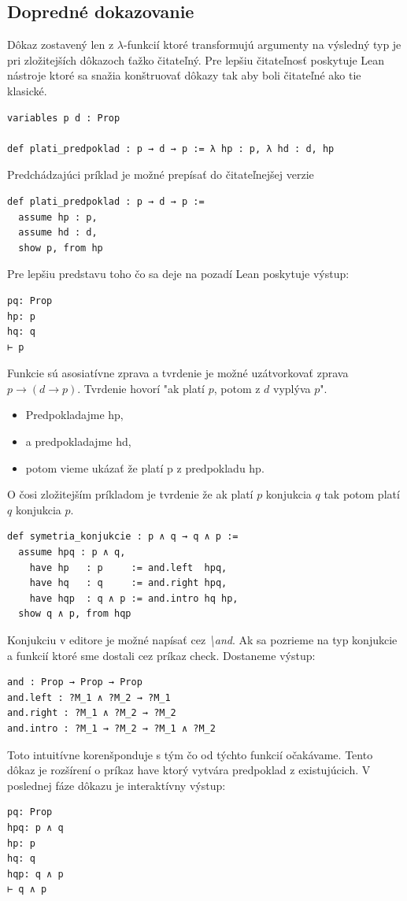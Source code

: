 \documentclass[a4paper,10pt,oneside]{report}%
\begin{document}
\subsection{Dopredné dokazovanie}
    Dôkaz zostavený len z $\lambda$-funkcií ktoré transformujú argumenty
na výsledný typ je pri zložitejších dôkazoch ťažko čitateľný.
    Pre lepšiu čitateľnosť poskytuje Lean nástroje ktoré sa snažia konštruovať dôkazy tak
aby boli čitateľné ako tie klasické.
\begin{lstlisting}
variables p d : Prop

def plati_predpoklad : p → d → p := λ hp : p, λ hd : d, hp
\end{lstlisting}
    Predchádzajúci príklad je možné prepísať do čitateľnejšej verzie
\begin{lstlisting}
def plati_predpoklad : p → d → p :=
  assume hp : p,
  assume hd : d,
  show p, from hp
\end{lstlisting}
Pre lepšiu predstavu toho čo sa deje na pozadí Lean poskytuje výstup:
\begin{lstlisting}
pq: Prop
hp: p
hq: q
⊢ p
\end{lstlisting}
    Funkcie sú asosiatívne zprava a tvrdenie je možné uzátvorkovať zprava
$p \to ( d \to p )$. Tvrdenie hovorí "ak platí $p$, potom z $d$ vyplýva $p$".
\begin{itemize}
    \item Predpokladajme hp,
    \item a predpokladajme hd,
    \item potom vieme ukázať že platí p z predpokladu hp.
\end{itemize}
    O čosi zložitejším príkladom je tvrdenie že ak platí $p$ konjukcia $q$ tak potom
platí $q$ konjukcia $p$.
\begin{lstlisting}
def symetria_konjukcie : p ∧ q → q ∧ p :=
  assume hpq : p ∧ q,
    have hp   : p     := and.left  hpq,
    have hq   : q     := and.right hpq,
    have hqp  : q ∧ p := and.intro hq hp,
  show q ∧ p, from hqp
\end{lstlisting}
    Konjukciu v editore je možné napísať cez \emph{\textbackslash and}.
    Ak sa pozrieme na typ konjukcie a funkcií ktoré sme dostali cez príkaz check.
    Dostaneme výstup:
\begin{lstlisting}
and : Prop → Prop → Prop
and.left : ?M_1 ∧ ?M_2 → ?M_1
and.right : ?M_1 ∧ ?M_2 → ?M_2
and.intro : ?M_1 → ?M_2 → ?M_1 ∧ ?M_2
\end{lstlisting}
    Toto intuitívne korenšponduje s tým čo od týchto funkcií očakávame.
    Tento dôkaz je rozšírení o príkaz have ktorý vytvára predpoklad z existujúcich.
    V poslednej fáze dôkazu je interaktívny výstup:
\begin{lstlisting}
pq: Prop
hpq: p ∧ q
hp: p
hq: q
hqp: q ∧ p
⊢ q ∧ p
\end{lstlisting}
\end{document}
